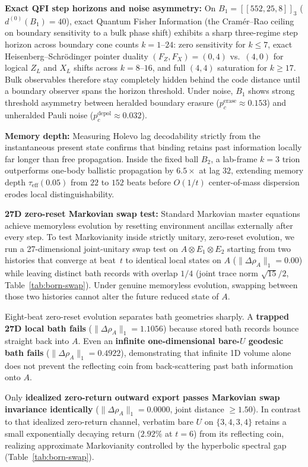 \textbf{Exact QFI step horizons and noise asymmetry:} On $B_1 = [[552, 25, 8]]_3$ ($d^{(0)}(B_1) = 40$), exact Quantum
Fisher Information (the Cram\'er--Rao ceiling on boundary sensitivity to a bulk phase shift) exhibits a sharp
three-regime step horizon across boundary cone counts $k = 1\text{--}24$: zero sensitivity for $k \le 7$, exact
Heisenberg--Schr\"odinger pointer duality $(F_Z, F_X) = (0, 4)$ vs.\ $(4, 0)$ for logical $Z_L$ and $X_L$ shifts across
$k = 8\text{--}16$, and full $(4, 4)$ saturation for $k \ge 17$. Bulk observables therefore stay completely hidden behind
the code distance until a boundary observer spans the horizon threshold. Under noise, $B_1$ shows strong threshold
asymmetry between heralded boundary erasure ($p_c^{\mathrm{erase}} \approx 0.153$) and unheralded Pauli noise
($p_c^{\mathrm{depol}} \approx 0.032$).

\textbf{Memory depth:} Measuring Holevo lag decodability strictly from the instantaneous present state confirms that
binding retains past information locally far longer than free propagation. Inside the fixed ball $B_2$, a lab-frame
$k = 3$ trion outperforms one-body ballistic propagation by \textbf{$6.5\times$} at lag $32$, extending memory depth
$\tau_{\mathrm{eff}}(0.05)$ from $22$ to $152$ beats before $O(1/t)$ center-of-mass dispersion erodes local
distinguishability.

\textbf{27D zero-reset Markovian swap test:} Standard Markovian master equations achieve memoryless evolution by
resetting environment ancillas externally after every step. To test Markovianity inside strictly unitary, zero-reset
evolution, we run a 27-dimensional joint-unitary swap test on $A \otimes E_1 \otimes E_2$ starting from two histories
that converge at beat~$t$ to identical local states on $A$ ($\|\Delta\rho_A\|_1 = 0.00$) while leaving distinct bath
records with overlap $1/4$ (joint trace norm $\sqrt{15}/2$, Table~\ref{tab:born-swap}). Under genuine memoryless
evolution, swapping between those two histories cannot alter the future reduced state of $A$.

Eight-beat zero-reset evolution separates bath geometries sharply. A \textbf{trapped 27D local bath fails}
($\|\Delta\rho_A\|_1 = 1.1056$) because stored bath records bounce straight back into $A$. Even an \textbf{infinite
one-dimensional bare-$U$ geodesic bath fails} ($\|\Delta\rho_A\|_1 = 0.4922$), demonstrating that infinite 1D volume
alone does not prevent the reflecting coin from back-scattering past bath information onto $A$.

Only \textbf{idealized zero-return outward export passes Markovian swap invariance identically}
($\|\Delta\rho_A\|_1 = 0.0000$, joint distance $\ge 1.50$). In contrast to that idealized zero-return channel, verbatim
bare $U$ on $\{3,4,3,4\}$ retains a small exponentially decaying return ($2.92\%$ at $t = 6$) from its reflecting coin,
realizing approximate Markovianity controlled by the hyperbolic spectral gap (Table~\ref{tab:born-swap}).

